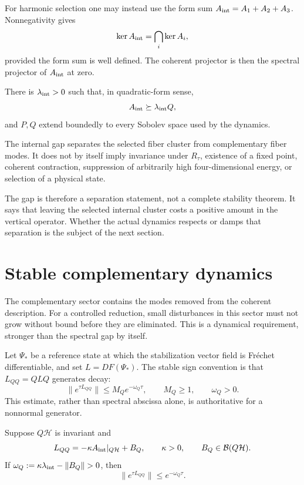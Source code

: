 \documentclass[11pt]{article}
\begin{document}
For harmonic selection one may instead use the form sum
$A_{\rm int}=A_1+A_2+A_3$. Nonnegativity gives
\[
 \ker A_{\rm int}=\bigcap_i\ker A_i,
\]
provided the form sum is well defined. The coherent projector is then the
spectral projector of $A_{\rm int}$ at zero.

\begin{assumption}\label{ass:gap}
There is $\lambda_{\rm int}>0$ such that, in quadratic-form sense,
\[
 A_{\rm int}\succeq\lambda_{\rm int}Q,
\]
and $P,Q$ extend boundedly to every Sobolev space used by the dynamics.
\end{assumption}

The internal gap separates the selected fiber cluster from complementary
fiber modes. It does not by itself imply invariance under $R_\tau$, existence
of a fixed point, coherent contraction, suppression of arbitrarily high
four-dimensional energy, or selection of a physical state.

The gap is therefore a separation statement, not a complete stability
theorem. It says that leaving the selected internal cluster costs a positive
amount in the vertical operator. Whether the actual dynamics respects or
damps that separation is the subject of the next section.

\section{Stable complementary dynamics}

The complementary sector contains the modes removed from the coherent
description. For a controlled reduction, small disturbances in this sector
must not grow without bound before they are eliminated. This is a dynamical
requirement, stronger than the spectral gap by itself.

Let $\Psi_\ast$ be a reference state at which the stabilization vector field is
Fr\'echet differentiable, and set $L=DF(\Psi_\ast)$. The stable sign convention
is that $L_{QQ}=QLQ$ generates decay:
\[
 \|e^{\tau L_{QQ}}\|\le M_Qe^{-\omega_Q\tau},
 \qquad M_Q\ge1,\qquad\omega_Q>0.
 \label{eq:q-semigroup}
\]
This estimate, rather than spectral abscissa alone, is authoritative for a
nonnormal generator.

\begin{proposition}
Suppose $Q\mathcal H$ is invariant and
\[
 L_{QQ}=-\kappa A_{\rm int}|_{Q\mathcal H}+B_Q,
 \qquad \kappa>0,\qquad B_Q\in\mathcal B(Q\mathcal H).
\]
If $\omega_Q:=\kappa\lambda_{\rm int}-\|B_Q\|>0$, then
\[
 \|e^{\tau L_{QQ}}\|\le e^{-\omega_Q\tau}.
\]
\end{proposition}
\end{document}
